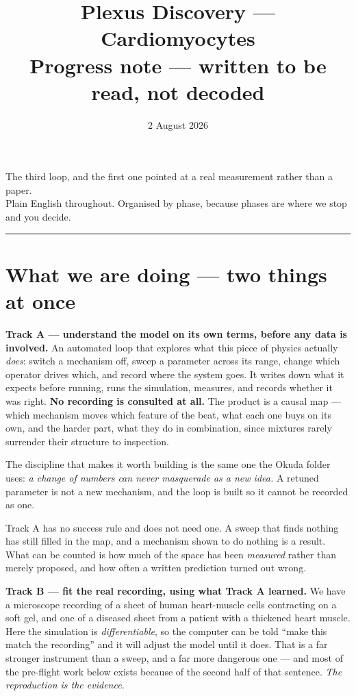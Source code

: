 \documentclass[11pt,a4paper]{article}
\title{\textbf{Plexus Discovery --- Cardiomyocytes}\\[6pt]
\large Progress note --- written to be read, not decoded}
\author{}
\date{2 August 2026}
\begin{document}
\maketitle
\vspace{-2.2\baselineskip}

\begin{center}\small\color{grey}
The third loop, and the first one pointed at a real measurement rather than a paper.\\
Plain English throughout. Organised by phase, because phases are where we stop and you decide.
\end{center}

\vspace{4pt}
\hrule
\vspace{10pt}

\section{What we are doing --- two things at once}

\textbf{Track A --- understand the model on its own terms, before any data is involved.} An
automated loop that explores what this piece of physics actually \emph{does}: switch a mechanism
off, sweep a parameter across its range, change which operator drives which, and record where the
system goes. It writes down what it expects before running, runs the simulation, measures, and
records whether it was right. \textbf{No recording is consulted at all.} The product is a causal
map --- which mechanism moves which feature of the beat, what each one buys on its own, and the
harder part, what they do in combination, since mixtures rarely surrender their structure to
inspection.

The discipline that makes it worth building is the same one the Okuda folder uses: \emph{a change
of numbers can never masquerade as a new idea.} A retuned parameter is not a new mechanism, and the
loop is built so it cannot be recorded as one.

Track A has no success rule and does not need one. A sweep that finds nothing has still filled in
the map, and a mechanism shown to do nothing is a result. What can be counted is how much of the
space has been \emph{measured} rather than merely proposed, and how often a written prediction
turned out wrong.

\textbf{Track B --- fit the real recording, using what Track A learned.} We have a microscope
recording of a sheet of human heart-muscle cells contracting on a soft gel, and one of a diseased
sheet from a patient with a thickened heart muscle. Here the simulation is \emph{differentiable}, so
the computer can be told ``make this match the recording'' and it will adjust the model until it
does. That is a far stronger instrument than a sweep, and a far more dangerous one --- and most of
the pre-flight work below exists because of the second half of that sentence. \emph{The
reproduction is the evidence.}
\end{document}
